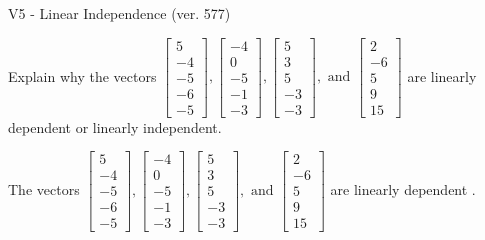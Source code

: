 \begin{exercise}
  \begin{exerciseTitle}V5 - Linear Independence (ver. 577)\end{exerciseTitle}
  \begin{exerciseStatement}
    Explain why the vectors \(\left[\begin{array}{r}
5 \\
-4 \\
-5 \\
-6 \\
-5
\end{array}\right] , \left[\begin{array}{r}
-4 \\
0 \\
-5 \\
-1 \\
-3
\end{array}\right] , \left[\begin{array}{r}
5 \\
3 \\
5 \\
-3 \\
-3
\end{array}\right] , \text{ and } \left[\begin{array}{r}
2 \\
-6 \\
5 \\
9 \\
15
\end{array}\right]\) are linearly dependent or linearly independent.	


  \end{exerciseStatement}
  \begin{exerciseAnswer}
   The vectors \(\left[\begin{array}{r}
5 \\
-4 \\
-5 \\
-6 \\
-5
\end{array}\right] , \left[\begin{array}{r}
-4 \\
0 \\
-5 \\
-1 \\
-3
\end{array}\right] , \left[\begin{array}{r}
5 \\
3 \\
5 \\
-3 \\
-3
\end{array}\right] , \text{ and } \left[\begin{array}{r}
2 \\
-6 \\
5 \\
9 \\
15
\end{array}\right]\) are 
  	 linearly dependent  .
  


  \end{exerciseAnswer}
\end{exercise}